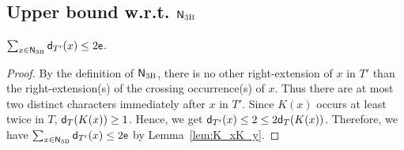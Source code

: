   \subsection{Upper bound w.r.t. $\mathsf{N}_{\mathrm{3B}}$}

  \begin{lemma} 
    \label{lem:dt3}
    $\sum_{x \in \mathsf{N}_{\mathrm{3B}}}\mathsf{d}_{T'}(x) \le 2\mathsf{e}$.
  \end{lemma}
  
  \begin{proof}
    By the definition of $\mathsf{N}_{\mathrm{3B}}$,
    there is no other right-extension of $x$ in $T'$ than the right-extension(s) of the crossing occurrence(s) of $x$.
    Thus 
    there are at most two distinct characters immediately after $x$ in $T'$.
    Since $K(x)$ occurs at least twice in $T$, $\mathsf{d}_T(K(x)) \geq 1$.
    Hence, we get $\mathsf{d}_{T'}(x) \leq 2 \leq 2\mathsf{d}_T(K(x))$.
    Therefore, we have $\sum_{x \in \mathsf{N}_{\mathrm{3B}}}\mathsf{d}_{T'}(x) \le 2\mathsf{e}$ by Lemma~\ref{lem:K_xK_y}.
  \end{proof}

